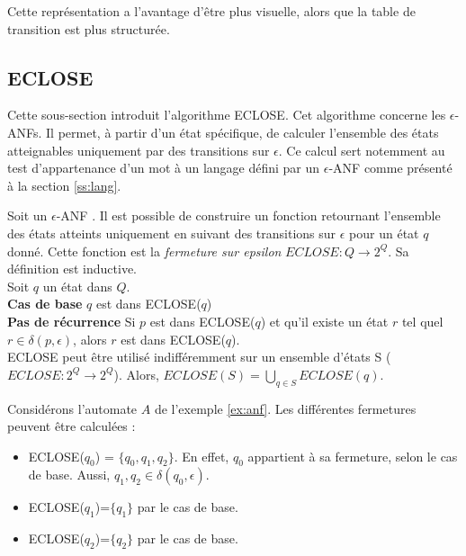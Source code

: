 Cette représentation a l'avantage d'être plus visuelle, alors que la table de transition est plus structurée.


\subsection{ECLOSE}\label{adf:eclose}

Cette sous-section introduit l'algorithme ECLOSE. Cet algorithme concerne les $\epsilon$-ANFs. Il permet, à partir d'un état spécifique, de calculer l'ensemble des états atteignables uniquement par des transitions sur $\epsilon$. Ce calcul sert notemment au test d'appartenance d'un mot à un langage défini par un $\epsilon$-ANF comme présenté à la section \ref{ss:lang}.

Soit un $\epsilon$-ANF \automaton. Il est possible de construire un fonction retournant l'ensemble des états atteints uniquement en suivant des transitions sur $\epsilon$ pour un état $q$ donné. Cette fonction est la \emph{fermeture sur epsilon} $ECLOSE : Q \rightarrow 2^Q$. Sa définition est inductive.\\

Soit $q$ un état dans $Q$.\\
\textbf{Cas de base} $q$ est dans ECLOSE($q$)\\
\textbf{Pas de récurrence} Si $p$ est dans ECLOSE($q$) et qu'il existe un état $r$ tel quel $r\in\delta(p,\epsilon)$, alors $r$ est dans ECLOSE($q$).\\

ECLOSE peut être utilisé indifféremment sur un ensemble d'états S ($ECLOSE : 2^Q \rightarrow 2^Q$). Alors, $ECLOSE(S)=\bigcup_{q\in S}ECLOSE(q)$.

\begin{example}[ECLOSE]\label{ex:anfclosure} Considérons l'automate $A$ de l'exemple \ref{ex:anf}. Les différentes fermetures peuvent être calculées :
	\begin{itemize}
		\item ECLOSE($q_0$) = $\{q_0,q_1,q_2\}$. En effet, $q_0$ appartient à sa fermeture, selon le cas de base. Aussi, $q_1,q_2\in\delta(q_0, \epsilon)$.
		\item ECLOSE($q_1$)=$\{q_1\}$ par le cas de base.
		\item ECLOSE($q_2$)=$\{q_2\}$ par le cas de base.
	\end{itemize}
\end{example}



